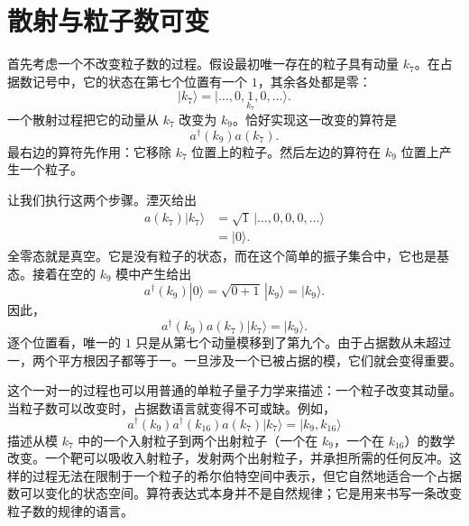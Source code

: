 \section{散射与粒子数可变}

首先考虑一个不改变粒子数的过程。假设最初唯一存在的粒子具有动量 \(k_7\)。在占据数记号中，它的状态在第七个位置有一个 \(1\)，其余各处都是零：
\begin{equation}
|k_7\rangle
=
|\ldots,0,\underset{k_7}{1},0,\ldots\rangle.
\end{equation}
一个散射过程把它的动量从 \(k_7\) 改变为 \(k_9\)。恰好实现这一改变的算符是
\begin{equation}
a^\dagger(k_9)a(k_7).
\end{equation}
最右边的算符先作用：它移除 \(k_7\) 位置上的粒子。然后左边的算符在 \(k_9\) 位置上产生一个粒子。

\begin{classroomqa}
\end{classroomqa}

让我们执行这两个步骤。湮灭给出
\begin{align}
a(k_7)|k_7\rangle
&=
\sqrt{1}\,|\ldots,0,0,0,\ldots\rangle\\
&=|0\rangle.
\end{align}
全零态就是真空。它是没有粒子的状态，而在这个简单的振子集合中，它也是基态。接着在空的 \(k_9\) 模中产生给出
\begin{equation}
a^\dagger(k_9)|0\rangle
=\sqrt{0+1}\,|k_9\rangle
=|k_9\rangle.
\end{equation}
因此，
\begin{equation}
a^\dagger(k_9)a(k_7)|k_7\rangle=|k_9\rangle.
\end{equation}
逐个位置看，唯一的 \(1\) 只是从第七个动量模移到了第九个。由于占据数从未超过一，两个平方根因子都等于一。一旦涉及一个已被占据的模，它们就会变得重要。

这个一对一的过程也可以用普通的单粒子量子力学来描述：一个粒子改变其动量。当粒子数可以改变时，占据数语言就变得不可或缺。例如，
\begin{equation}
a^\dagger(k_9)a^\dagger(k_{16})a(k_7)|k_7\rangle
=|k_9,k_{16}\rangle
\end{equation}
描述从模 \(k_7\) 中的一个入射粒子到两个出射粒子（一个在 \(k_9\)，一个在 \(k_{16}\)）的数学改变。一个靶可以吸收入射粒子，发射两个出射粒子，并承担所需的任何反冲。这样的过程无法在限制于一个粒子的希尔伯特空间中表示，但它自然地适合一个占据数可以变化的状态空间。算符表达式本身并不是自然规律；它是用来书写一条改变粒子数的规律的语言。

